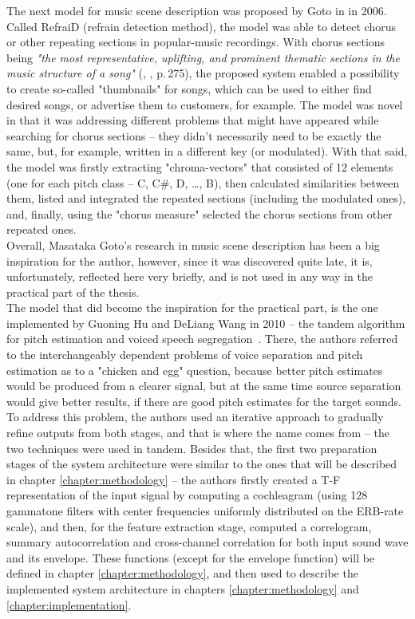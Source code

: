 The next model for music scene description was proposed by Goto in \cite{Goto2006} in 2006. Called \mbox{RefraiD} (refrain detection method), the model was able to detect chorus or other repeating sections in popular-music recordings. With chorus sections being \textit{"the most representative, uplifting, and prominent thematic sections in the music structure of a song"} (\cite{Goto2006}, \cite{Wang2006}, p.\,275), the proposed system enabled a possibility to create so-called "thumbnails" for songs, which can be used to either find desired songs, or advertise them to customers, for example. The model was novel in that it was addressing different problems that might have appeared while searching for chorus sections -- they didn't necessarily need to be exactly the same, but, for example, written in a different key (or modulated). With that said, the model was firstly extracting "chroma-vectors" that consisted of 12 elements (one for each pitch class -- C, C\#, D, \dots{}, B), then calculated similarities between them, listed and integrated the repeated sections (including the modulated ones), and, finally, using the "chorus measure" selected the chorus sections from other repeated ones.\\

Overall, Masataka Goto's research in music scene description has been a big inspiration for the author, however, since it was discovered quite late, it is, unfortunately, reflected here very briefly, and is not used in any way in the practical part of the thesis.\\

The model that did become the inspiration for the practical part, is the one implemented by Guoning Hu and DeLiang Wang in 2010 -- the tandem algorithm for pitch estimation and voiced speech seg\-re\-ga\-tion~\cite{Hu2010}. There, the authors referred to the interchangeably dependent problems of voice separation and pitch estimation as to a "chicken and egg" question, because better pitch estimates would be produced from a clearer signal, but at the same time source separation would give better results, if there are good pitch estimates for the target sounds. To address this problem, the authors used an iterative approach to gradually refine outputs from both stages, and that is where the name comes from -- the two techniques were used in tandem. Besides that, the first two preparation stages of the system architecture were similar to the ones that will be described in chapter \ref{chapter:methodology} -- the authors firstly created a T-F representation of the input signal by computing a cochleagram (using 128 gammatone filters with center frequencies uniformly distributed on the ERB-rate scale), and then, for the feature extraction stage, computed a correlogram, summary autocorrelation and cross-channel correlation for both input sound wave and its envelope. These functions (except for the envelope function) will be defined in chapter \ref{chapter:methodology}, and then used to describe the implemented system architecture in chapters \ref{chapter:methodology} and \ref{chapter:implementation}.\\

